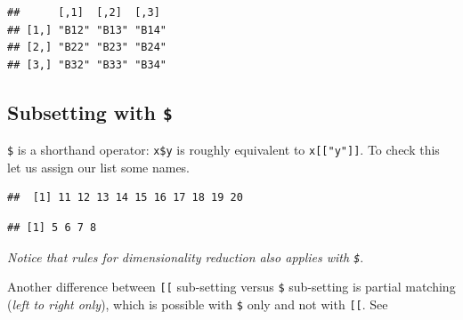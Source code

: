 \documentclass[
]{book}
\newenvironment{Shaded}{\begin{snugshade}}{\end{snugshade}}
\newcommand{\CommentTok}[1]{\textcolor[rgb]{0.56,0.35,0.01}{\textit{#1}}}
\newcommand{\FunctionTok}[1]{\textcolor[rgb]{0.13,0.29,0.53}{\textbf{#1}}}
\newcommand{\NormalTok}[1]{#1}
\newcommand{\OtherTok}[1]{\textcolor[rgb]{0.56,0.35,0.01}{#1}}
\newcommand{\SpecialCharTok}[1]{\textcolor[rgb]{0.81,0.36,0.00}{\textbf{#1}}}
\newcommand{\StringTok}[1]{\textcolor[rgb]{0.31,0.60,0.02}{#1}}
\begin{document}
\begin{verbatim}
##      [,1]  [,2]  [,3] 
## [1,] "B12" "B13" "B14"
## [2,] "B22" "B23" "B24"
## [3,] "B32" "B33" "B34"
\end{verbatim}

\hypertarget{subsetting-with}{%
\subsection{\texorpdfstring{Subsetting with \texttt{\$}}{Subsetting with \$}}\label{subsetting-with}}

\texttt{\$} is a shorthand operator: \texttt{x\$y} is roughly equivalent to \texttt{x{[}{[}"y"{]}{]}}. To check this let us assign our list some names.

\begin{Shaded}
\end{Shaded}

\begin{verbatim}
##  [1] 11 12 13 14 15 16 17 18 19 20
\end{verbatim}

\begin{Shaded}
\end{Shaded}

\begin{verbatim}
## [1] 5 6 7 8
\end{verbatim}

\emph{Notice that rules for dimensionality reduction also applies with \texttt{\$}}.

Another difference between \texttt{{[}{[}} sub-setting versus \texttt{\$} sub-setting is partial matching (\emph{left to right only}), which is possible with \texttt{\$} only and not with \texttt{{[}{[}}. See

\begin{Shaded}
\end{Shaded}
\end{document}
